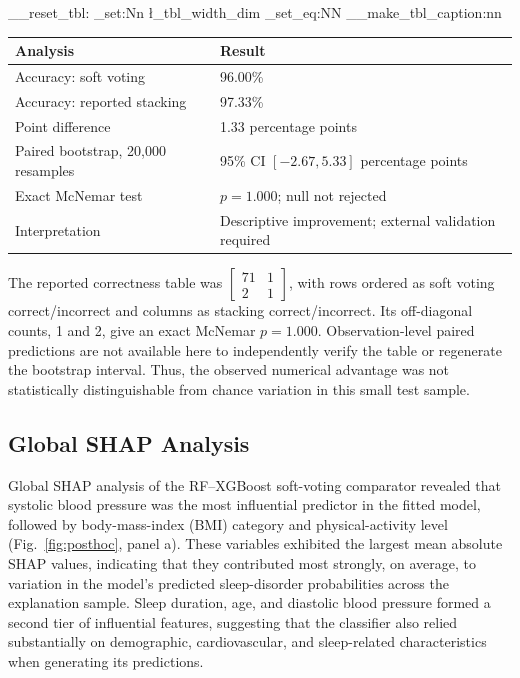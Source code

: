 \documentclass[a4paper,fleqn]{cas-dc}
\begin{document}
\par\nopagebreak\smallskip
\noindent\begin{minipage}{\columnwidth}
\centering
\makeatletter
\ExplSyntaxOn
\__reset_tbl:
\dim_set:Nn \l_tbl_width_dim { \columnwidth }
\cs_set_eq:NN \@makecaption \__make_tbl_caption:nn
\ExplSyntaxOff
\makeatother
{}
\label{tab:stats}
\footnotesize
\setlength{\tabcolsep}{3pt}
\renewcommand{\arraystretch}{1.05}
\begin{tabularx}{\columnwidth}{@{}Q{0.42\columnwidth}Y@{}}
\toprule
Analysis & Result \\
\midrule
Accuracy: soft voting & 96.00\% \\
Accuracy: reported stacking & 97.33\% \\
Point difference & 1.33 percentage points \\
Paired bootstrap, 20,000 resamples & 95\% CI $[-2.67,5.33]$ percentage points \\
Exact McNemar test & $p=1.000$; null not rejected \\
Interpretation & Descriptive improvement; external validation required \\
\bottomrule
\end{tabularx}
\end{minipage}
\par\smallskip


The reported correctness table was $\begin{bmatrix}71&1\\2&1\end{bmatrix}$, with rows ordered as soft voting correct/incorrect and columns as stacking correct/incorrect. Its off-diagonal counts, 1 and 2, give an exact McNemar $p=1.000$. Observation-level paired predictions are not available here to independently verify the table or regenerate the bootstrap interval. Thus, the observed numerical advantage was not statistically distinguishable from chance variation in this small test sample.


\subsection{Global SHAP Analysis}
\label{sec:globalshap}

Global SHAP analysis of the RF--XGBoost soft-voting comparator revealed that
systolic blood pressure was the most influential predictor in the fitted model,
followed by body-mass-index (BMI) category and physical-activity level
(Fig.~\ref{fig:posthoc}, panel a). These variables exhibited the largest mean
absolute SHAP values, indicating that they contributed most strongly, on
average, to variation in the model's predicted sleep-disorder probabilities
across the explanation sample. Sleep duration, age, and diastolic blood pressure
formed a second tier of influential features, suggesting that the classifier
also relied substantially on demographic, cardiovascular, and sleep-related
characteristics when generating its predictions.
\end{document}
